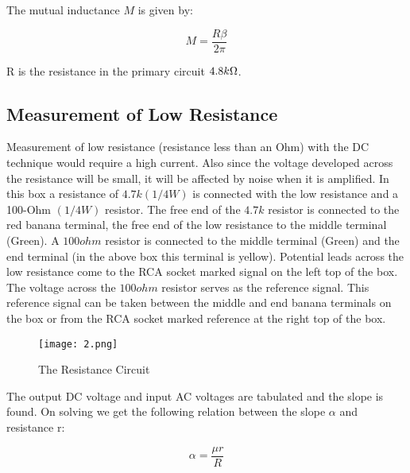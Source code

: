 		The mutual inductance $M$ is given by:

		\begin{equation}
			M = \frac{R\beta}{2\pi}
			\label{eqn:1}
		\end{equation}

		R is the resistance in the primary circuit $4.8 k\ohm$.
	
	\subsection{Measurement of Low Resistance}
		Measurement of low resistance (resistance less than an Ohm) with the DC technique would require a high current. Also since the voltage developed across the resistance will be small, it will be affected by noise when it is amplified. In this box a resistance of $4.7 k (1/4 W)$ is connected with the low resistance and a 100-Ohm $(1/4 W)$ resistor. The free end of the $4.7k$ resistor is connected to the red banana terminal, the free end of the low resistance to the middle terminal (Green). A $100ohm$ resistor is connected to the middle terminal (Green) and the end terminal (in the above box this terminal is yellow). Potential leads across the low resistance come to the RCA socket marked signal on the left top of the box. The voltage across the $100ohm$ resistor serves as the reference signal. This reference signal can be taken between the middle and end banana terminals on the box or from the RCA socket marked reference at the right top of the box.
	
		\begin{figure}[H]
			\centering
			\texttt{[image: 2.png]}
			\caption{The Resistance Circuit}
			\label{fig:2}
		\end{figure}

		The output DC voltage and input AC voltages are tabulated and the slope is found. On solving we get the following relation between the slope $\alpha$ and resistance r:

		\begin{equation}
			\alpha = \frac{\mu r}{R}
			\label{eqn:2}
		\end{equation}
